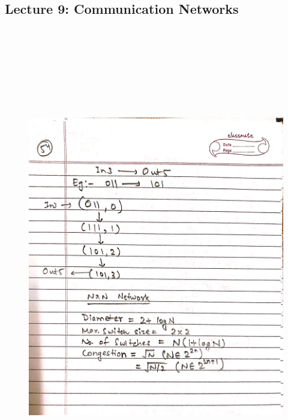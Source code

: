 \newpage
{\color{black} \subsection*{Lecture 9: Communication Networks}}
\begin{figure}[H]
    \centering
    \includegraphics[width=16cm, height=21cm]{"./MIT-6.042J/MIT-6042J-054"}
\end{figure}

